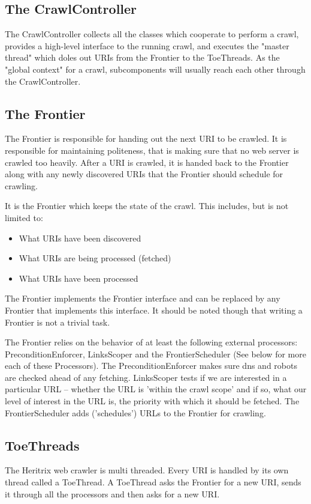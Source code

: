 \documentclass[11pt,a4paper]{article}
\begin{document}
\subsection{The CrawlController}
The CrawlController collects all the classes which cooperate to perform a crawl, provides a high-level interface to the running crawl, and executes the "master thread" which doles out URIs from the Frontier to the ToeThreads. As the "global context" for a crawl, subcomponents will usually reach each other through the CrawlController.

\subsection{The Frontier}
The Frontier is responsible for handing out the next URI to be crawled. It is responsible for maintaining politeness, that is making sure that no web server is crawled too heavily. After a URI is crawled, it is handed back to the Frontier along with any newly discovered URIs that the Frontier should schedule for crawling.

It is the Frontier which keeps the state of the crawl. This includes, but is not limited to:

\begin{itemize}
\item What URIs have been discovered
\item What URIs are being processed (fetched)
\item What URIs have been processed
\end{itemize}

The Frontier implements the Frontier interface and can be replaced by any Frontier that implements this interface. It should be noted though that writing a Frontier is not a trivial task.

The Frontier relies on the behavior of at least the following external processors: PreconditionEnforcer, LinksScoper and the FrontierScheduler (See below for more each of these Processors). The PreconditionEnforcer makes sure dns and robots are checked ahead of any fetching. LinksScoper tests if we are interested in a particular URL -- whether the URL is 'within the crawl scope' and if so, what our level of interest in the URL is, the priority with which it should be fetched. The FrontierScheduler adds ('schedules') URLs to the Frontier for crawling.

\subsection{ToeThreads}
The Heritrix web crawler is multi threaded. Every URI is handled by its own thread called a ToeThread. A ToeThread asks the Frontier for a new URI, sends it through all the processors and then asks for a new URI.
\end{document}
